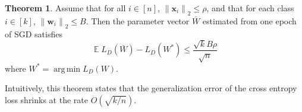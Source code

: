 \documentclass[twoside]{article}
\theoremstyle{definition}
\newtheorem{defn}{Definition}
\newtheorem{theorem}{Theorem}
\newtheorem{corollary}{Corollary}
\DeclareMathOperator{\E}{\mathbb E}
\DeclareMathOperator*{\argmin}{arg\,min}
\renewcommand{\star}[1]{{#1}^{*}}
\newcommand{\w}{\mathbf w}
\newcommand{\x}{\mathbf x}
\newcommand{\ltwo}[1]{{\lVert {#1} \rVert}_2}
\newcommand{\lF}[1]{{\lVert {#1} \rVert}_F}
\begin{document}
\begin{theorem}
\label{theorem:xentropy}
Assume that for all $i\in[n]$, $\ltwo{\x_i} \le \rho$,
    and that for each class $i\in[k]$, $\ltwo{\w_i}\le B$.
Then the parameter vector $\bar W$ estimated from one epoch of SGD satisfies
\begin{equation}
    \E L_D(\bar W) - L_D(W^*) \le \frac {\sqrt kB\rho}{\sqrt n}
\end{equation}
where $W^* = \argmin L_D(W)$.
\end{theorem}

Intuitively, this theorem states that the generalization error of the cross entropy loss shrinks at the rate $O(\sqrt{k/n})$.

%
%
%
%
\end{document}
